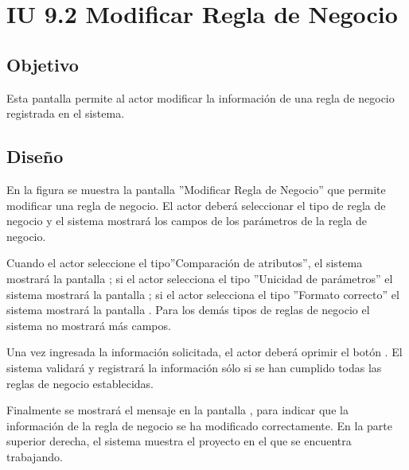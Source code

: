 \section{IU 9.2 Modificar Regla de Negocio}

\subsection{Objetivo}
	Esta pantalla permite al actor modificar la información de una regla de negocio registrada en el sistema.
\subsection{Diseño}
	En la figura  se muestra la pantalla ''Modificar Regla de Negocio'' que permite modificar una regla de negocio. El actor deberá seleccionar el tipo de regla de negocio y el sistema mostrará los campos de los parámetros de la regla de negocio.
	
	Cuando el actor seleccione el tipo''Comparación de atributos'', el sistema mostrará la pantalla ; si el actor selecciona el tipo ''Unicidad de parámetros'' el sistema mostrará la pantalla ; si el actor selecciona el tipo ''Formato correcto'' el sistema mostrará la pantalla . Para los demás tipos de reglas de negocio el sistema no mostrará más campos.
	
	Una vez ingresada la información solicitada, el actor deberá oprimir el botón . El sistema validará y registrará la información sólo si se han cumplido todas las reglas de negocio establecidas.
	
	Finalmente se mostrará el mensaje  en la pantalla , para indicar que la información de la regla de negocio se ha modificado correctamente.
	En la parte superior derecha, el sistema muestra el proyecto en el que se encuentra trabajando.

